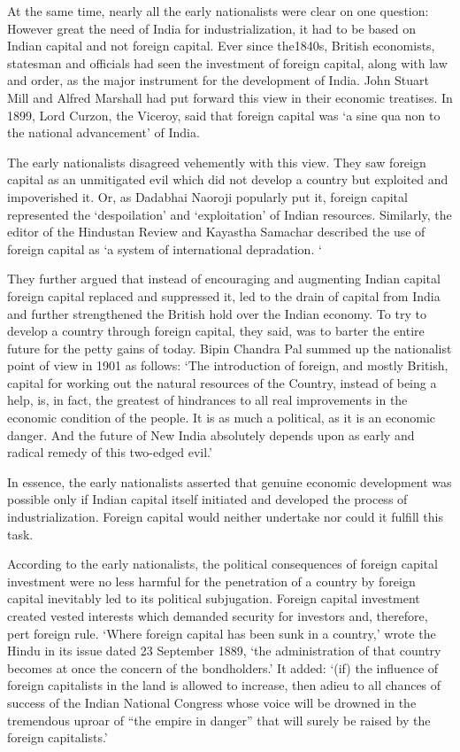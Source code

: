 At the same time, nearly all the early nationalists were clear on one question: However great the need of India for industrialization, it had to be based on Indian capital and not foreign capital. Ever since the1840s, British economists, statesman and officials had seen the investment of foreign capital, along with law and order, as the major instrument for the development of India. John Stuart Mill and Alfred Marshall had put forward this view in their economic treatises. In 1899, Lord Curzon, the Viceroy, said that foreign capital was ‘a sine qua non to the national advancement’ of India.

The early nationalists disagreed vehemently with this view. They saw foreign capital as an unmitigated evil which did not develop a country but exploited and impoverished it. Or, as Dadabhai Naoroji popularly put it, foreign capital represented the ‘despoilation’ and ‘exploitation’ of Indian resources. Similarly, the editor of the Hindustan Review and Kayastha Samachar described the use of foreign capital as ‘a system of international depradation. ‘

They further argued that instead of encouraging and augmenting Indian capital foreign capital replaced and suppressed it, led to the drain of capital from India and further strengthened the British hold over the Indian economy. To try to develop a country through foreign capital, they said, was to barter the entire future for the petty gains of today. Bipin Chandra Pal summed up the nationalist point of view in 1901 as follows: ‘The introduction of foreign, and mostly British, capital for working out the natural resources of the Country, instead of being a help, is, in fact, the greatest of hindrances to all real improvements in the economic condition of the people. It is as much a political, as it is an economic danger. And the future of New India absolutely depends upon as early and radical remedy of this two-edged evil.’

In essence, the early nationalists asserted that genuine economic development was possible only if Indian capital itself initiated and developed the process of industrialization. Foreign capital would neither undertake nor could it fulfill this task.

According to the early nationalists, the political consequences of foreign capital investment were no less harmful for the penetration of a country by foreign capital inevitably led to its political subjugation. Foreign capital investment created vested interests which demanded security for investors and, therefore, pert foreign rule. ‘Where foreign capital has been sunk in a country,’ wrote the Hindu in its issue dated 23 September 1889, ‘the administration of that country becomes at once the concern of the bondholders.’ It added: ‘(if) the influence of foreign capitalists in the land is allowed to increase, then adieu to all chances of success of the Indian National Congress whose voice will be drowned in the tremendous uproar of “the empire in danger” that will surely be raised by the foreign capitalists.’

